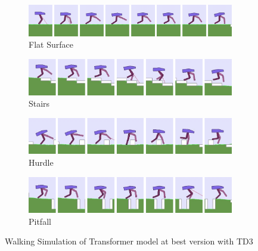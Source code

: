\begin{figure}[!ht]
	\centering
	\begin{subfigure}{.9\textwidth}
		\centering
		\includegraphics[width=0.99\textwidth]{figures/bipedal/anim/trsf_flat.png}
		\caption{Flat Surface}
		\label{fig:anim_trsf_flat}
	\end{subfigure}
	\begin{subfigure}{.9\textwidth}
		\centering
		\includegraphics[width=0.99\textwidth]{figures/bipedal/anim/trsf_stairs.png}
		\caption{Stairs}
		\label{fig:anim_trsf_stairs}
	\end{subfigure}
	\begin{subfigure}{.9\textwidth}
		\centering
		\includegraphics[width=0.99\textwidth]{figures/bipedal/anim/trsf_hurdle.png}
		\caption{Hurdle}
		\label{fig:anim_trsf_hurdle}
	\end{subfigure}
	\begin{subfigure}{.9\textwidth}
		\centering
		\includegraphics[width=0.99\textwidth]{figures/bipedal/anim/trsf_pitfall.png}
		\caption{Pitfall}
		\label{fig:anim_trsf_pitfall}
	\end{subfigure}
	\caption{Walking Simulation of Transformer model at best version with TD3}
	\label{fig:trsf_simulation}
\end{figure}
